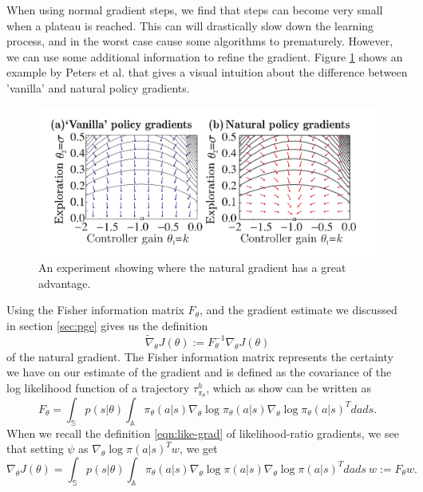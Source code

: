 When using normal gradient steps, we find that steps can become very small when a plateau is reached. This can will drastically slow down the learning process, and in the worst case cause some algorithms to prematurely. However, we can use some additional information to refine the gradient. Figure \ref{fig:nat-grad-adv} shows an example by Peters et al. \cite{Peters_IICHR_2003} that gives a visual intuition about the difference between 'vanilla' and natural policy gradients. 

\begin{figure}
  \includegraphics[width=\textwidth]{nat-grad-adv}
  \caption{An experiment showing where the natural gradient has a great advantage. \cite{Peters_IICHR_2003} }\label{fig:nat-grad-adv}
\end{figure}

Using the Fisher information matrix $F_\theta$, and the gradient estimate we discussed in section \ref{sec:pge} gives us the definition
\begin{equation}
  \widetilde{\nabla}_\theta J(\theta) := F^{-1}_\theta \nabla_\theta J(\theta)
  \label{eqn:nat-grad}
\end{equation}
of the natural gradient. The Fisher information matrix represents the certainty we have on our estimate of the gradient and is defined as the covariance of the log likelihood function of a trajectory $\tau_{\pi_\theta}^h$, which as \cite{4863} show can be written as 
\begin{equation}
  F_\theta = \int_\mathbb{S} p(s|\theta) \int_\mathbb{A} \pi_\theta(a|s) \nabla_\theta \log{\pi_\theta(a|s)} \nabla_\theta \log{\pi_\theta(a|s)}^T dads.
  \label{eqn:F}
\end{equation}
When we recall the definition \eqref{eqn:like-grad} of likelihood-ratio gradients, we see that setting $\psi$ as $\nabla_\theta \log \pi(a|s)^T w$, we get
\begin{equation}
  \nabla_\theta J(\theta) = \int_\mathbb{S} {p(s|\theta) \int_\mathbb{A} \pi_\theta(a|s) \nabla_\theta \log \pi(a|s) {\nabla_\theta \log \pi(a|s)}^T dads}\ w := F_\theta w.
  \label{eqn:J-equals-F}
\end{equation}

